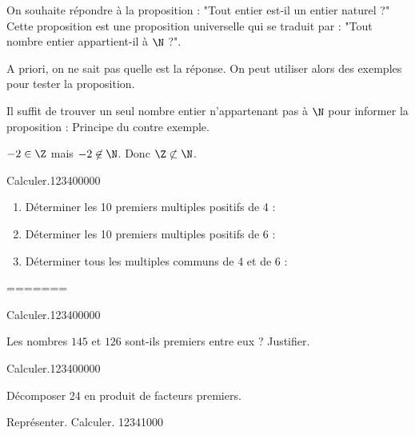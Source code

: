 \begin{pageCours}
\begin{LogT}{On souhaite répondre à la proposition : "Tout entier est-il un entier naturel ?"  }
Cette proposition est une proposition universelle qui se traduit par : "Tout nombre entier appartient-il à $\N$ ?". 

A priori, on ne sait pas quelle est la réponse. On peut utiliser alors des exemples pour tester la proposition.

Il suffit de trouver un seul nombre entier n'appartenant pas à $\N$ pour informer la proposition : Principe du contre exemple. 


$-2 \in \Z$ mais $-2 \not \in \N$. Donc $\Z \not \subset \N$.

\end{LogT}


\end{pageCours} 
\begin{pageAD} 



\begin{ExoCad}{Calculer.}{1234}{0}{0}{0}{0}{0}
\begin{enumerate}
\item Déterminer les 10 premiers multiples positifs de 4 : 
\item Déterminer les 10 premiers multiples positifs de 6 : 
\item Déterminer tous les multiples communs de 4 et de 6 : 
\end{enumerate}
\end{ExoCad}
=======



\begin{ExoCad}{Calculer.}{1234}{0}{0}{0}{0}{0}

Les nombres $145$ et $126$ sont-ils premiers entre eux ? Justifier.


\end{ExoCad}





\begin{ExoCad}{Calculer.}{1234}{0}{0}{0}{0}{0}

Décomposer 24 en produit de facteurs premiers.


\end{ExoCad}

\begin{ExoCad}{Représenter. Calculer. }{1234}{1}{0}{0}{0}

\begin{minipage}{0.55\linewidth}


\end{minipage}
\end{ExoCad}
\end{pageAD}
